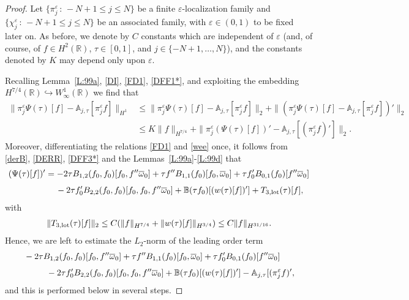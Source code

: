 \documentclass[11pt,reqno]{amsart}
\numberwithin{equation}{section}
\newcommand{\0}{\Omega}
\newcommand{\e}{\varepsilon}
\newcommand{\ov}{\overline}
\newcommand{\oo}{\ov\omega}
\newcommand{\bA}{\mathbb{A}}
\newcommand{\bB}{\mathbb{B}}
\newcommand{\R}{\mathbb{R}}
\numberwithin{equation}{section}
\begin{document}
\begin{proof} Let $\{\pi_j^\e\,:\, -N+1\leq j\leq N\} $ be a finite $\e$-localization family   and $\{\chi_j^\e\,:\, -N+1\leq j\leq N\} $ be an associated family, 
with $\e\in(0,1)$ to be fixed later on. As before, we denote by $C$ constants which are
independent of $\e$ (and, of course, of $f\in H^2(\R)$, $\tau\in [0,1]$, and $j \in \{-N+1, \ldots, N\}$), and the constants  denoted by $K$ may depend only upon $\e.$ \medskip
 
Recalling Lemma~\ref{L:99a},  \eqref{DI}, \eqref{FD1},  \eqref{DFF1*}, and exploiting the embedding $H^{7/4}(\R)\hookrightarrow W^1_\infty(\R)$ we find that
 \begin{align}
  \|\pi_j^\e \Psi(\tau) [f]-\bA_{j,\tau}[\pi^\e_j f]\|_{H^1}&\leq \|\pi_j^\e \Psi(\tau) [f]-\bA_{j,\tau}[\pi^\e_j f]\|_{2} +\|(\pi_j^\e \Psi(\tau) [f]-\bA_{j,\tau}[\pi^\e_j f])'\|_{2}\nonumber\\[1ex]
  &\leq K\|f\|_{H^{7/4}} +\|\pi_j^\e (\Psi(\tau) [f])'-\bA_{j,\tau}[(\pi^\e_j f)']\|_{2}.\label{oto1}
 \end{align}
Moreover, differentiating the relations \eqref{FD1} and \eqref{wee} once, it follows from \eqref{derB}, \eqref{DERR}, \eqref{DFF3*} and the Lemmas~\ref{L:99a}-\ref{L:99d} that  
\begin{align*}
 (\Psi(\tau) [f])'&=-2\tau  B_{1,2}( f_0, f_0)[ f_0,f''\oo_0]+\tau  f''B_{1,1}( f_0)[f_0,\oo_0] +\tau  f_0' B_{0,1}( f_0 )[ f''\oo_0]\\[1ex] 
 &\hspace{0.424cm}-2\tau f_0' B_{2,2}( f_0,f_0)[ f_0,f_0,f''\oo_0]  + \bB(\tau f_0)[(w(\tau)[f])'] +T_{3,{\rm lot}}(\tau)[f],
\end{align*}
 with 
\begin{align}
   \|T_{3,{\rm lot}}(\tau)[f]\|_2\leq C(\|f\|_{H^{7/4}}+\|w(\tau)[f]\|_{H^{3/4}})\leq C\|f\|_{H^{31/16}}.  \label{oto2}
 \end{align}
 Hence, we are left to estimate the $L_2$-norm of the leading order term
 \begin{align*}
&-2\tau  B_{1,2}( f_0, f_0)[ f_0,f''\oo_0]+\tau  f''B_{1,1}( f_0)[f_0,\oo_0] +\tau  f_0' B_{0,1}( f_0 )[ f''\oo_0]\\[1ex] 
 &\hspace{0.924cm}-2\tau f_0' B_{2,2}( f_0,f_0)[ f_0,f_0,f''\oo_0]  + \bB(\tau f_0)[(w(\tau)[f])'] -\bA_{j,\tau}[(\pi^\e_j f)',
\end{align*}
 and this is performed below in several steps.
 \medskip
 

\end{proof}
\end{document}
